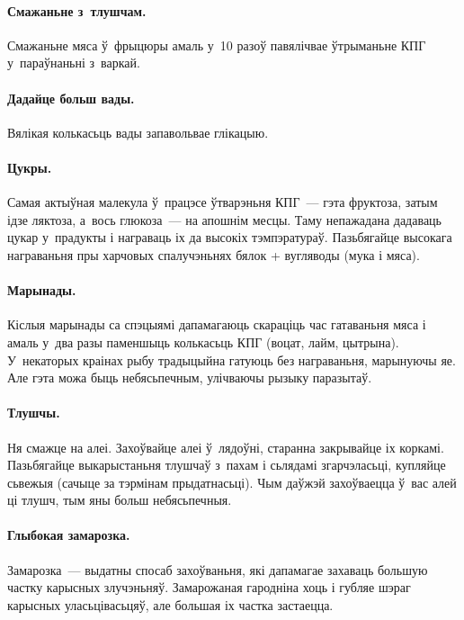 \paragraph{Смажаньне з~тлушчам.}
Смажаньне мяса ў~фрыцюры амаль у~10 разоў павялічвае ўтрыманьне КПГ у~параўнаньні з~варкай.

\paragraph{Дадайце больш вады.}
Вялікая колькасьць вады запавольвае глікацыю.

\paragraph{Цукры.}
Самая актыўная малекула ў~працэсе ўтварэньня КПГ~--- гэта фруктоза, затым ідзе ляктоза, а~вось глюкоза~--- на апошнім месцы. Таму непажадана дадаваць цукар у~прадукты і награваць іх да высокіх тэмпэратураў. Пазьбягайце высокага награваньня пры харчовых спалучэньнях бялок + вугляводы (мука і мяса).


\paragraph{Марынады.}
Кіслыя марынады са спэцыямі дапамагаюць скараціць час гатаваньня мяса і амаль у~два разы паменшыць колькасьць КПГ (воцат, лайм, цытрына). У~некаторых краінах рыбу традыцыйна гатуюць без награваньня, марынуючы яе. Але гэта можа быць небясьпечным, улічваючы рызыку паразытаў.

\paragraph{Тлушчы.}
Ня смажце на алеі. Захоўвайце алеі ў~лядоўні, старанна закрывайце іх коркамі. Пазьбягайце выкарыстаньня тлушчаў з~пахам і сьлядамі згарчэласьці, купляйце сьвежыя (сачыце за тэрмінам прыдатнасьці). Чым даўжэй захоўваецца ў~вас алей ці тлушч, тым яны больш небясьпечныя.

\paragraph{Глыбокая замарозка.}
Замарозка~--- выдатны спосаб захоўваньня, які дапамагае захаваць большую частку карысных злучэньняў. Замарожаная гародніна хоць і губляе шэраг карысных уласьцівасьцяў, але большая іх частка застаецца.

